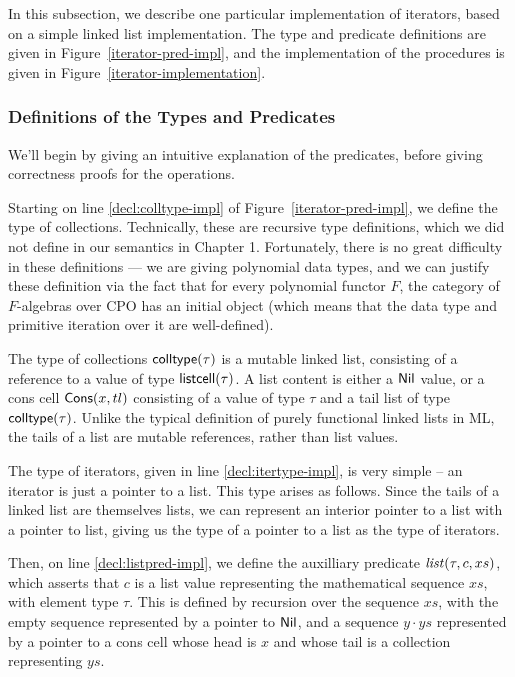 In this subsection, we describe one particular implementation of
iterators, based on a simple linked list implementation. The type and
predicate definitions are given in Figure~\ref{iterator-pred-impl},
and the implementation of the procedures is given in
Figure~\ref{iterator-implementation}. 


\subsubsection{Definitions of the Types and Predicates}

We'll begin by giving an intuitive explanation of the predicates,
before giving correctness proofs for the operations.

Starting on line \ref{decl:colltype-impl} of
Figure~\ref{iterator-pred-impl}, we define the type of
collections. Technically, these are recursive type definitions, which
we did not define in our semantics in Chapter 1. Fortunately, there is
no great difficulty in these definitions --- we are giving polynomial
data types, and we can justify these definition via the fact that for
every polynomial functor $F$, the category of $F$-algebras over CPO
has an initial object (which means that the data type and primitive
iteration over it are well-defined).

The type of collections $\mathsf{colltype}(\tau)$ is a mutable linked list,
consisting of a reference to a value of type $\mathsf{listcell}(\tau)$. A
list content is either a $\mathsf{Nil}$ value, or a cons cell $\mathsf{Cons}(x, tl)$
consisting of a value of type $\tau$ and a tail list of type
$\mathsf{colltype}(\tau)$. Unlike the typical definition of purely functional
linked lists in ML, the tails of a list are mutable references, rather
than list values.

The type of iterators, given in line \ref{decl:itertype-impl}, is very
simple -- an iterator is just a pointer to a list. This type arises as
follows. Since the tails of a linked list are themselves lists, we can
represent an interior pointer to a list with a pointer to list, giving
us the type of a pointer to a list as the type of iterators. 

Then, on line \ref{decl:listpred-impl}, we define the auxilliary
predicate $\mathit{list}(\tau, c, xs)$, which asserts that $c$ is a list
value representing the mathematical sequence $xs$, with element type
$\tau$. This is defined by recursion over the sequence $xs$, with the
empty sequence represented by a pointer to $\mathsf{Nil}$, and a sequence 
$y\cdot ys$ represented by a pointer to a cons cell whose head is $x$
and whose tail is a collection representing $ys$. 

